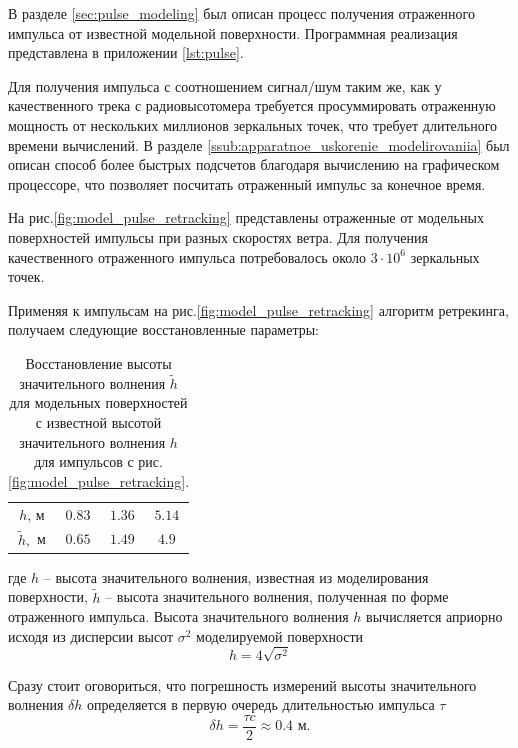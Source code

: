 В разделе \ref{sec:pulse_modeling} был описан процесс получения отраженного
импульса от известной модельной поверхности. 
Программная реализация
представлена в приложении \ref{lst:pulse}. 

Для получения импульса с соотношением сигнал/шум  таким же, как у качественного
трека с радиовысотомера требуется просуммировать отраженную мощность от
нескольких миллионов зеркальных точек, что требует длительного времени
вычислений. В разделе \ref{ssub:apparatnoe_uskorenie_modelirovaniia} был описан
способ более быстрых подсчетов благодаря вычислению на графическом процессоре,
что позволяет посчитать отраженный импульс за конечное время. 

На рис.\ref{fig:model_pulse_retracking} представлены отраженные от модельных
поверхностей импульсы при разных скоростях ветра. Для получения качественного
отраженного импульса потребовалось около $3\cdot 10^{6}$ зеркальных точек.

Применяя к импульсам на рис.\ref{fig:model_pulse_retracking} алгоритм
ретрекинга, получаем следующие восстановленные параметры:
\begin{table}[h]
    \centering
    \caption{Восстановление высоты значительного волнения $\tilde h$ для модельных
    поверхностей с известной высотой значительного волнения $h$ для импульсов с
рис. \ref{fig:model_pulse_retracking}.}
    \label{tab:model}
        \begin{tabular}{|c|c|c|c|}
            \hline
            $h$, м      & $0.83$ & $1.36$ & $5.14$\\
            $\tilde h,$ м & $0.65$ & $1.49$ & $4.9$\\
            \hline
        \end{tabular}
\end{table}

где $h$ -- высота значительного волнения, известная из моделирования
поверхности, $\tilde h$ -- высота значительного волнения, полученная по форме
отраженного импульса. Высота значительного волнения $h$ вычисляется
априорно исходя из дисперсии высот $\sigma^2$ моделируемой поверхности \cite{waves} 
\begin{equation}
    h = 4 \sqrt{\sigma^2}
\end{equation}

Сразу стоит оговориться, что погрешность измерений высоты 
значительного волнения $\delta h$ определяется в первую очередь длительностью
импульса $\tau$
\begin{equation}
    \delta h = \frac{\tau c}{2} \approx 0.4 \text{ м}.
\end{equation}

